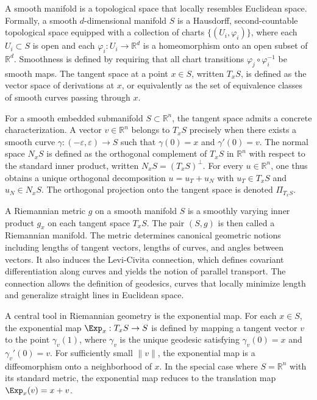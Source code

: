 \documentclass[12pt]{article}
\begin{document}
A smooth manifold is a topological space that locally resembles Euclidean space. Formally, a smooth $d$-dimensional manifold $S$ is a Hausdorff, second-countable topological space equipped with a collection of charts $\{(U_i, \varphi_i)\}$, where each $U_i \subset S$ is open and each $\varphi_i : U_i \to \mathbb{R}^d$ is a homeomorphism onto an open subset of $\mathbb{R}^d$. Smoothness is defined by requiring that all chart transitions $\varphi_j \circ \varphi_i^{-1}$ be smooth maps. The tangent space at a point $x \in S$, written $T_x S$, is defined as the vector space of derivations at $x$, or equivalently as the set of equivalence classes of smooth curves passing through $x$.

For a smooth embedded submanifold $S \subset \mathbb{R}^n$, the tangent space admits a concrete characterization. A vector $v \in \mathbb{R}^n$ belongs to $T_x S$ precisely when there exists a smooth curve $\gamma : (-\varepsilon, \varepsilon) \to S$ such that $\gamma(0) = x$ and $\gamma'(0) = v$. The normal space $N_x S$ is defined as the orthogonal complement of $T_x S$ in $\mathbb{R}^n$ with respect to the standard inner product, written $N_x S = (T_x S)^\perp$. For every $u \in \mathbb{R}^n$, one thus obtains a unique orthogonal decomposition $u = u_T + u_N$ with $u_T \in T_x S$ and $u_N \in N_x S$. The orthogonal projection onto the tangent space is denoted $\Pi_{T_x S}$.

A Riemannian metric $g$ on a smooth manifold $S$ is a smoothly varying inner product $g_x$ on each tangent space $T_x S$. The pair $(S, g)$ is then called a Riemannian manifold. The metric determines canonical geometric notions including lengths of tangent vectors, lengths of curves, and angles between vectors. It also induces the Levi-Civita connection, which defines covariant differentiation along curves and yields the notion of parallel transport. The connection allows the definition of geodesics, curves that locally minimize length and generalize straight lines in Euclidean space.

A central tool in Riemannian geometry is the exponential map. For each $x \in S$, the exponential map $\Exp_x : T_x S \to S$ is defined by mapping a tangent vector $v$ to the point $\gamma_v(1)$, where $\gamma_v$ is the unique geodesic satisfying $\gamma_v(0) = x$ and $\gamma_v'(0) = v$. For sufficiently small $\|v\|$, the exponential map is a diffeomorphism onto a neighborhood of $x$. In the special case where $S = \mathbb{R}^n$ with its standard metric, the exponential map reduces to the translation map $\Exp_x(v) = x + v$.
\end{document}
